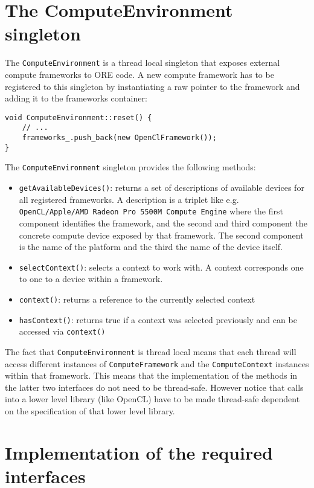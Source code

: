 \documentclass[12pt, a4paper]{article}
\begin{document}
\section{The ComputeEnvironment singleton}\label{ComputeEnvironment}

The \verb+ComputeEnvironment+ is a thread local singleton that exposes external compute frameworks to ORE code. A new
compute framework has to be registered to this singleton by instantiating a raw pointer to the framework and adding it
to the frameworks container:

\begin{verbatim}
void ComputeEnvironment::reset() {
    // ...
    frameworks_.push_back(new OpenClFramework());
}
\end{verbatim}

The \verb+ComputeEnvironment+ singleton provides the following methods:

\begin{itemize}
\item \verb+getAvailableDevices()+: returns a set of descriptions of available devices for all registered frameworks. A
  description is a triplet like e.g. \verb+OpenCL/Apple/AMD Radeon Pro 5500M Compute Engine+ where the first component
  identifies the framework, and the second and third component the concrete compute device exposed by that
  framework. The second component is the name of the platform and the third the name of the device itself.
\item \verb+selectContext()+: selects a context to work with. A context corresponds one to one to a device within a
  framework.
\item \verb+context()+: returns a reference to the currently selected context
\item \verb+hasContext()+: returns true if a context was selected previously and can be accessed via \verb+context()+
\end{itemize}

The fact that \verb+ComputeEnvironment+ is thread local means that each thread will access different instances of
\verb+ComputeFramework+ and the \verb+ComputeContext+ instances within that framework. This means that the
implementation of the methods in the latter two interfaces do not need to be thread-safe. However notice that calls into
a lower level library (like OpenCL) have to be made thread-safe dependent on the specification of that lower level
library.

\section{Implementation of the required interfaces}
\end{document}
